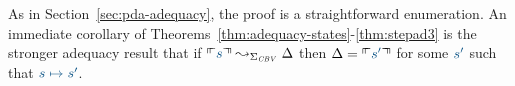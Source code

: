 \noindent
As in Section~\ref{sec:pda-adequacy}, 
the proof is a straightforward enumeration. An
immediate corollary of Theorems~\ref{thm:adequacy-states}-\ref{thm:stepad3}
is the stronger adequacy result that 
if $\ctxinterp{s} \leadsto_{\Sigma_{\it CBV}} \Delta$
then $\Delta = \ctxinterp{s'}$ for some $\obj{s'}$ such that 
$\obj{s \mapsto s'}$.



